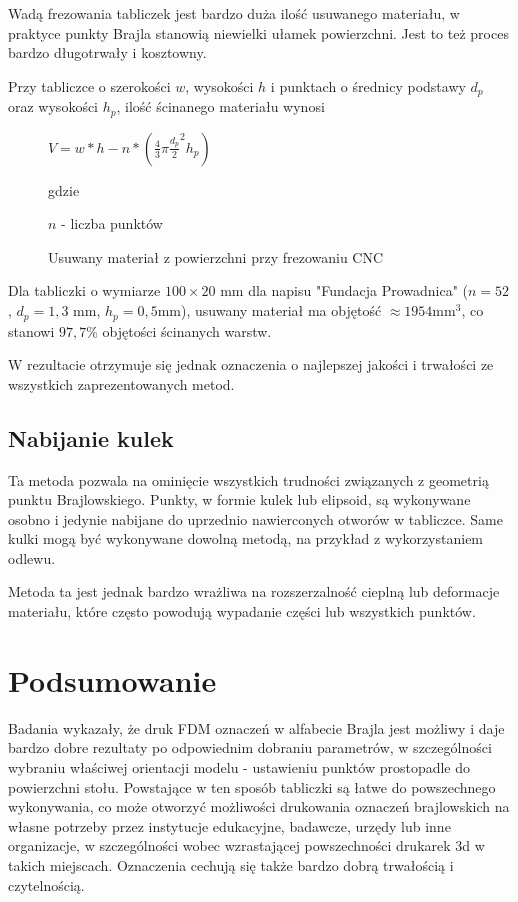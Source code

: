 \documentclass[12pt,a4paper]{article}
\begin{document}
Wadą frezowania tabliczek jest bardzo duża ilość usuwanego materiału, w praktyce punkty Brajla stanowią niewielki ułamek powierzchni. Jest to też proces bardzo długotrwały i kosztowny.

Przy tabliczce o szerokości $w$, wysokości $h$ i punktach o średnicy podstawy $d_p$ oraz wysokości $h_p$, ilość ścinanego materiału wynosi

\begin{figure}
$V = w*h - n * \left(\frac{4}{3}\pi \frac{d_p}{2}^2h_p\right)$

gdzie

$n$ - liczba punktów
\caption{Usuwany materiał z powierzchni przy frezowaniu CNC}
\end{figure}
Dla tabliczki o wymiarze $100 \times 20 \text{ mm}$ dla napisu "Fundacja Prowadnica" ($n=52$, $d_p=1{,}3 \text{ mm}$, $h_p=0{,}5 \text{mm}$), usuwany materiał ma objętość $\approx 1954 \text{mm}^3$, co stanowi $97{,}7\text{\%}$ objętości ścinanych warstw.

W rezultacie otrzymuje się jednak oznaczenia o najlepszej jakości i trwałości ze wszystkich zaprezentowanych metod.

\subsection{Nabijanie kulek}
Ta metoda pozwala na ominięcie wszystkich trudności związanych z geometrią punktu Brajlowskiego.
Punkty, w formie kulek lub elipsoid, są wykonywane osobno i jedynie nabijane do uprzednio nawierconych otworów w tabliczce. Same kulki mogą być wykonywane dowolną metodą, na przykład z wykorzystaniem odlewu.

Metoda ta jest jednak bardzo wrażliwa na rozszerzalność cieplną lub deformacje materiału, które często powodują wypadanie części lub wszystkich punktów.

\section{Podsumowanie}
Badania wykazały, że druk FDM oznaczeń w alfabecie Brajla jest możliwy i daje bardzo dobre rezultaty po odpowiednim dobraniu parametrów, w szczególności wybraniu właściwej orientacji modelu - ustawieniu punktów prostopadle do powierzchni stołu.
Powstające w ten sposób tabliczki są łatwe do powszechnego wykonywania, co może otworzyć możliwości drukowania oznaczeń brajlowskich na własne potrzeby przez instytucje edukacyjne, badawcze, urzędy lub inne organizacje, w szczególności wobec wzrastającej powszechności drukarek 3d w takich miejscach.
Oznaczenia cechują się także bardzo dobrą trwałością i czytelnością.
\end{document}
